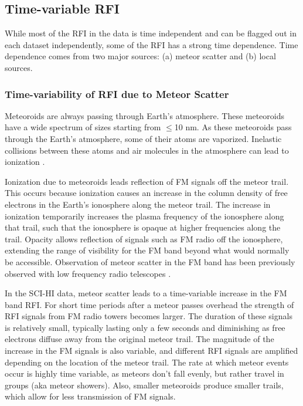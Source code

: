 \subsection{Time-variable RFI}

While most of the RFI in the data is time independent and can be flagged out in each dataset independently, some of the RFI has a strong time dependence. Time dependence comes from two major sources: (a) meteor scatter and (b) local sources. 

\subsubsection{Time-variability of RFI due to Meteor Scatter}

Meteoroids are always passing through Earth's atmosphere. These meteoroids have a wide spectrum of sizes starting from $\leq$10 nm. As these meteoroids pass through the Earth's atmosphere, some of their atoms are vaporized. Inelastic collisions between these atoms and air molecules in the atmosphere can lead to ionization \cite{meteor_review}. 

Ionization due to meteoroids leads reflection of FM signals off the meteor trail. This occurs because ionization causes an increase in the column density of free electrons in the Earth's ionosphere along the meteor trail. The increase in ionization temporarily increases the plasma frequency of the ionosphere along that trail, such that the ionosphere is opaque at higher frequencies along the trail. Opacity allows reflection of signals such as FM radio off the ionosphere, extending the range of visibility for the FM band beyond what would normally be accessible. Observation of meteor scatter in the FM band has been previously observed with low frequency radio telescopes \cite{nedeljkovic2007}. 

In the SCI-HI data, meteor scatter leads to a time-variable increase in the FM band RFI. For short time periods after a meteor passes overhead the strength of RFI signals from FM radio towers becomes larger. The duration of these signals is relatively small, typically lasting only a few seconds and diminishing as free electrons diffuse away from the original meteor trail. The magnitude of the increase in the FM signals is also variable, and different RFI signals are amplified depending on the location of the meteor trail. The rate at which meteor events occur is highly time variable, as meteors don't fall evenly, but rather travel in groups (aka meteor showers). Also, smaller meteoroids produce smaller trails, which allow for less transmission of FM signals.


